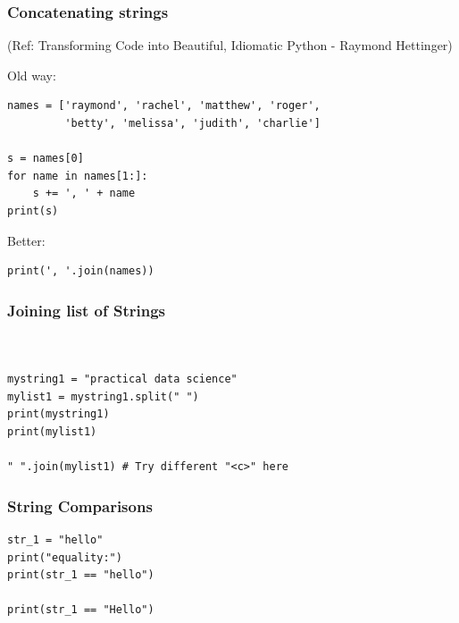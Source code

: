 \begin{frame}[fragile]\frametitle{Concatenating strings}
\tiny{(Ref: Transforming Code into Beautiful, Idiomatic Python -  Raymond Hettinger)}

Old way:

\begin{lstlisting}
names = ['raymond', 'rachel', 'matthew', 'roger',
         'betty', 'melissa', 'judith', 'charlie']

s = names[0]
for name in names[1:]:
    s += ', ' + name
print(s)
\end{lstlisting}
Better:
\begin{lstlisting}
print(', '.join(names))
\end{lstlisting}
\end{frame}


\begin{frame}[fragile]\frametitle{Joining list of Strings}

\begin{lstlisting}


mystring1 = "practical data science"
mylist1 = mystring1.split(" ")
print(mystring1)
print(mylist1)

" ".join(mylist1) # Try different "<c>" here
\end{lstlisting}
\end{frame}

\begin{frame}[fragile]\frametitle{String Comparisons}
\begin{lstlisting}
str_1 = "hello"
print("equality:")
print(str_1 == "hello")

print(str_1 == "Hello")
\end{lstlisting}
\end{frame}





